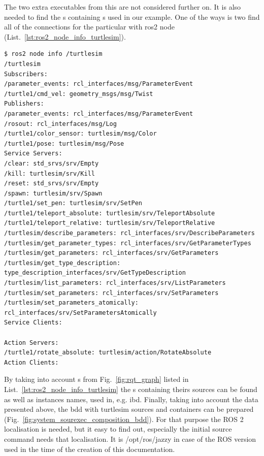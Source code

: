 \documentclass[11pt,oneside,a4paper]{report}
\begin{document}
The two extra executables from this \stPackage{} are not considered further on. It is also needed to find the \stPackage{}s containing \stRosConnection{}s used in our example. One of the ways is two find all of the connections for the particular \stNode{} with \textsf{ros2 node} \stCLTool{} (List.~\ref{lst:ros2_node_info_turtlesim}).


\begin{lstlisting}[style=terminal,label={lst:ros2_node_info_turtlesim},caption={ros2 node info /turtlesim}]
$ ros2 node info /turtlesim 
/turtlesim
Subscribers:
/parameter_events: rcl_interfaces/msg/ParameterEvent
/turtle1/cmd_vel: geometry_msgs/msg/Twist
Publishers:
/parameter_events: rcl_interfaces/msg/ParameterEvent
/rosout: rcl_interfaces/msg/Log
/turtle1/color_sensor: turtlesim/msg/Color
/turtle1/pose: turtlesim/msg/Pose
Service Servers:
/clear: std_srvs/srv/Empty
/kill: turtlesim/srv/Kill
/reset: std_srvs/srv/Empty
/spawn: turtlesim/srv/Spawn
/turtle1/set_pen: turtlesim/srv/SetPen
/turtle1/teleport_absolute: turtlesim/srv/TeleportAbsolute
/turtle1/teleport_relative: turtlesim/srv/TeleportRelative
/turtlesim/describe_parameters: rcl_interfaces/srv/DescribeParameters
/turtlesim/get_parameter_types: rcl_interfaces/srv/GetParameterTypes
/turtlesim/get_parameters: rcl_interfaces/srv/GetParameters
/turtlesim/get_type_description: type_description_interfaces/srv/GetTypeDescription
/turtlesim/list_parameters: rcl_interfaces/srv/ListParameters
/turtlesim/set_parameters: rcl_interfaces/srv/SetParameters
/turtlesim/set_parameters_atomically: rcl_interfaces/srv/SetParametersAtomically
Service Clients:

Action Servers:
/turtle1/rotate_absolute: turtlesim/action/RotateAbsolute
Action Clients:
\end{lstlisting}

By taking into account \stRosConnection{}s from Fig.~\ref{fig:rqt_graph} listed in List.~\ref{lst:ros2_node_info_turtlesim} the \stPackage{}s containing theirs sources can be found as well as 
instances names, used in, e.g. ibd. Finally, taking into account the data presented above, the bdd with \textsf{turtlesim} \stSystem{} sources and containers can be prepared (Fig.~\ref{fig:system_sourexec_composition_bdd}). For that purpose the ROS 2 \stWorkspace{} localisation is needed, but it easy to find out, especially the initial \textsf{source} command needs that localisation. It is  \textsf{/opt/ros/jazzy} in case of the ROS version used in the time of the creation of this documentation. 
\end{document}
